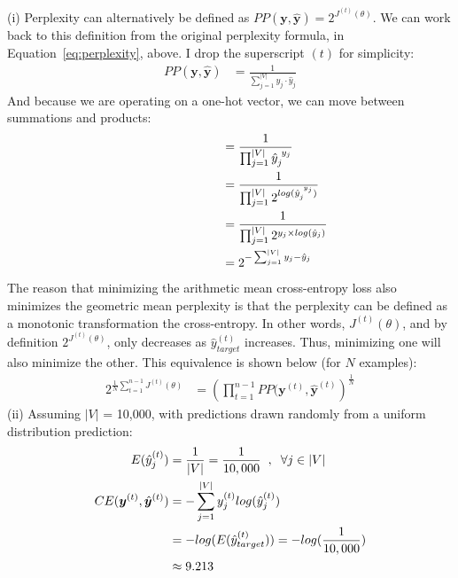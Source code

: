 \documentclass[fleqn]{MJD}
\newcommand{\0}{\emptyset}
\begin{document}
\noindent (i) Perplexity can alternatively be defined as $PP(\bm{y}, \hat{\bm{y}}) = 2^{J^{(t)}(\theta)}$. We can work back to this definition from the original perplexity formula, in Equation~\ref{eq:perplexity}, above. I drop the superscript $(t)$ for simplicity:
%
\begin{align}
	PP(\bm{y}, \hat{\bm{y}}) %
	&= \frac{ 1 }{ \sum_{j=1}^{\vert V \vert} y_{j} \cdot \hat{y}_{j}} \nonumber
\end{align}
%
\noindent And because we are operating on a one-hot vector, we can move between summations and products:
%
\begin{align}
	\hspace*{1in}&= \frac{ 1 }{ \prod_{j=1}^{\vert V \vert} \hat{y}_{j}^{\hspace*{0.1cm} y_{j}} } \nonumber \\
	\hspace*{1in}&= \frac{ 1 }{ \prod_{j=1}^{\vert V \vert} 2^{log(\hat{y}_{j}^{\hspace*{0.1cm} y_{j}} )}} \nonumber \\
	\hspace*{1in}&= \frac{ 1 }{ \prod_{j=1}^{\vert V \vert} 2^{y_{j} \times log(\hat{y}_{j})} } \nonumber \\
	\hspace*{1in}&= 2^{-\sum_{j=1}^{\vert V \vert} y_{j} - \hat{y}_{j} } \nonumber
\end{align}
%
\noindent The reason that minimizing the arithmetic mean cross-entropy loss also minimizes the geometric mean perplexity is that the perplexity can be defined as a monotonic transformation the cross-entropy. In other words, $J^{(t)}(\theta)$, and by definition $2^{J^{(t)}(\theta)}$, only decreases as $\hat{y}_{target}^{(t)}$ increases. Thus, minimizing one will also minimize the other. This equivalence is shown below (for $N$ examples):
%
\begin{align}
	2^{\frac{1}{N} \sum_{t=1}^{n-1} J^{(t)}(\theta)} %
	&= \left( \prod_{t=1}^{n-1} PP(\bm{y}^{(t)}, \hat{\bm{y}}^{(t)} \right)^{\frac{1}{N}} \nonumber
\end{align}
%
%
\newpage 
\noindent(ii) Assuming $|V|$ = 10,000, with predictions drawn randomly from a uniform distribution prediction:
%
\begin{align}
	E(\hat{y}_{j}^{(t)}) &= \frac{1}{|V|} = \frac{1}{10,000} \hspace*{0.2cm}, \hspace*{0.2cm} \forall j \in |V| \nonumber \\
	CE(\bm{y}^{(t)} , \hat{\bm{y}}^{(t)}) %
	&= - \sum_{j=1}^{|V|} y_{j}^{(t)} log(\hat{y}_{j}^{(t)}) \nonumber \\
	&= - log(E(\hat{y}_{target}^{(t)})) = - log(\frac{1}{10,000}) \nonumber \\
	&\approx 9.213 \nonumber 
\end{align}
\end{document}

